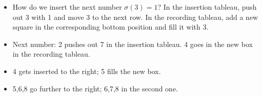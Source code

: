 \documentclass[../notes.tex]{subfiles}
\begin{document}
\begin{itemize}
\begin{itemize}
        \begin{center}
        \end{center}
        \item How do we insert the next number $\sigma(3)=1$? In the insertion tableau, push out 3 with 1 and move 3 to the next row. In the recording tableau, add a new square in the corresponding bottom position and fill it with 3.
        \begin{center}
        \end{center}
        \item Next number: 2 pushes out 7 in the insertion tableau. 4 goes in the new box in the recording tableau.
        \begin{center}
        \end{center}
        \item 4 gets inserted to the right; 5 fills the new box.
        \begin{center}
        \end{center}
        \item 5,6,8 go further to the right; 6,7,8 in the second one.
        \begin{center}
\end{center}
\end{itemize}
\end{itemize}
\end{document}
